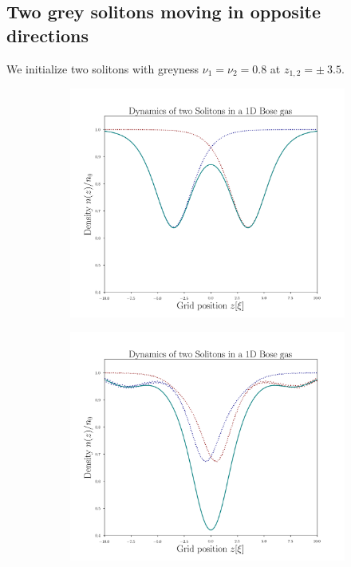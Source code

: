 \subsection{Two grey solitons moving in opposite directions}
We initialize two solitons with greyness $\nu_1 = \nu_2 = 0.8$ at $z_{1,2} = \pm \ 3.5$.
 \begin{figure}[H]
 \centering
  \begin{subfigure}{0.42\textwidth} 
 	\includegraphics[width= \textwidth]{figures/two_grey_3_5_0}
 \end{subfigure}
 \begin{subfigure}{0.42\textwidth} 
 	\includegraphics[width= \textwidth]{figures/two_grey_3_5_400}

\end{subfigure}
\end{figure}
